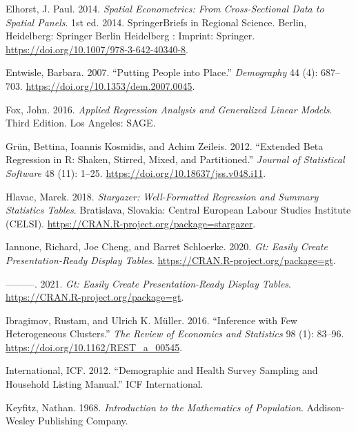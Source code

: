 \documentclass[
  letterpaper,
  DIV=11,
  numbers=noendperiod]{scrreprt}
\newlength{\cslhangindent}
\newlength{\cslentryspacingunit} %
\newenvironment{CSLReferences}[2] %
 {%
  \setlength{\parindent}{0pt}
  \ifodd #1
  \let\oldpar\par
  \def\par{\hangindent=\cslhangindent\oldpar}
  \fi
  \setlength{\parskip}{#2\cslentryspacingunit}
 }%
 {}
\begin{document}
\begin{CSLReferences}{1}{0}
\leavevmode{}%
Elhorst, J. Paul. 2014. \emph{Spatial {Econometrics}: {From}
{Cross}-{Sectional} {Data} to {Spatial} {Panels}}. 1st ed. 2014.
{SpringerBriefs} in {Regional} {Science}. Berlin, Heidelberg: Springer
Berlin Heidelberg : Imprint: Springer.
\url{https://doi.org/10.1007/978-3-642-40340-8}.

\leavevmode{}%
Entwisle, Barbara. 2007. {``Putting People into Place.''}
\emph{Demography} 44 (4): 687--703.
\url{https://doi.org/10.1353/dem.2007.0045}.

\leavevmode{}%
Fox, John. 2016. \emph{Applied Regression Analysis and Generalized
Linear Models}. Third Edition. Los Angeles: SAGE.

\leavevmode{}%
Grün, Bettina, Ioannis Kosmidis, and Achim Zeileis. 2012. {``Extended
Beta Regression in {R}: Shaken, Stirred, Mixed, and Partitioned.''}
\emph{Journal of Statistical Software} 48 (11): 1--25.
\url{https://doi.org/10.18637/jss.v048.i11}.

\leavevmode{}%
Hlavac, Marek. 2018. \emph{Stargazer: Well-Formatted Regression and
Summary Statistics Tables}. Bratislava, Slovakia: Central European
Labour Studies Institute (CELSI).
\url{https://CRAN.R-project.org/package=stargazer}.

\leavevmode{}%
Iannone, Richard, Joe Cheng, and Barret Schloerke. 2020. \emph{Gt:
Easily Create Presentation-Ready Display Tables}.
\url{https://CRAN.R-project.org/package=gt}.

\leavevmode{}%
---------. 2021. \emph{Gt: Easily Create Presentation-Ready Display
Tables}. \url{https://CRAN.R-project.org/package=gt}.

\leavevmode{}%
Ibragimov, Rustam, and Ulrich K. Müller. 2016. {``Inference with {Few}
{Heterogeneous} {Clusters}.''} \emph{The Review of Economics and
Statistics} 98 (1): 83--96. \url{https://doi.org/10.1162/REST_a_00545}.

\leavevmode{}%
International, ICF. 2012. {``Demographic and {Health} {Survey}
{Sampling} and {Household} {Listing} {Manual}.''} ICF International.

\leavevmode{}%
Keyfitz, Nathan. 1968. \emph{Introduction to the {Mathematics} of
{Population}}. Addison-Wesley Publishing Company.


\end{CSLReferences}
\end{document}
